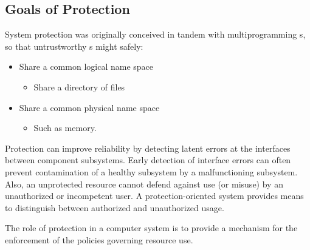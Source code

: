 \subsection{Goals of Protection}\label{subsec:Goals_of_Protection}
System protection was originally conceived in tandem with multiprogramming s, so that untrustworthy s might safely:
\begin{itemize}[noitemsep]
\item Share a common logical name space
  \begin{itemize}[noitemsep]
  \item Share a directory of files
  \end{itemize}
\item Share a common physical name space
  \begin{itemize}[noitemsep]
  \item Such as memory.
  \end{itemize}
\end{itemize}

Protection can improve reliability by detecting latent errors at the interfaces between component subsystems.
Early detection of interface errors can often prevent contamination of a healthy subsystem by a malfunctioning subsystem.
Also, an unprotected resource cannot defend against use (or misuse) by an unauthorized or incompetent user.
A protection-oriented system provides means to distinguish between authorized and unauthorized usage.

The role of protection in a computer system is to provide a mechanism for the enforcement of the policies governing resource use.


